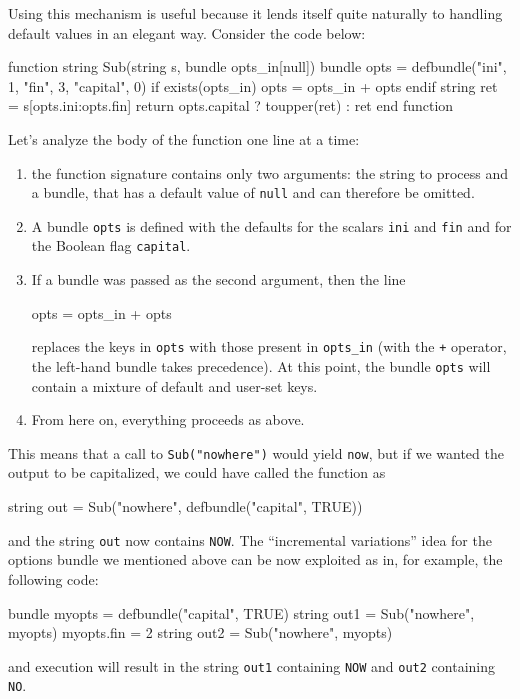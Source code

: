 Using this mechanism is useful because it lends itself quite naturally
to handling default values in an elegant way. Consider the code below:
\begin{code}
function string Sub(string s, bundle opts_in[null])
    bundle opts = defbundle("ini", 1, "fin", 3, "capital", 0)
    if exists(opts_in)
        opts = opts_in + opts
    endif
    string ret = s[opts.ini:opts.fin]
    return opts.capital ? toupper(ret) : ret
end function
\end{code}
Let's analyze the body of the function one line at a time:
\begin{enumerate}
\item the function signature contains only two arguments: the string
  to process and a bundle, that has a default value of \texttt{null}
  and can therefore be omitted.
\item A bundle \texttt{opts} is defined with the defaults for the
  scalars \texttt{ini} and \texttt{fin} and for the Boolean flag
  \texttt{capital}.
\item If a bundle was passed as the second argument, then the line
  \begin{code}
     opts = opts_in + opts
  \end{code}
  replaces the keys in \texttt{opts} with those present in
  \texttt{opts\_in} (with the \texttt{+} operator, the left-hand
  bundle takes precedence). At this point, the bundle \texttt{opts}
  will contain a mixture of default and user-set keys.
\item From here on, everything proceeds as above.
\end{enumerate}

This means that a call to \texttt{Sub("nowhere")} would yield
\texttt{now}, but if we wanted the output to be capitalized, we could
have called the function as
\begin{code}
  string out = Sub("nowhere", defbundle("capital", TRUE))
\end{code}
and the string \texttt{out} now contains \texttt{NOW}.  The
``incremental variations'' idea for the options bundle we mentioned
above can be now exploited as in, for example, the following code:
\begin{code}
  bundle myopts = defbundle("capital", TRUE)
  string out1 = Sub("nowhere", myopts)
  myopts.fin = 2
  string out2 = Sub("nowhere", myopts)
\end{code}
and execution will result in the string \texttt{out1} containing
\texttt{NOW} and \texttt{out2} containing \texttt{NO}.

